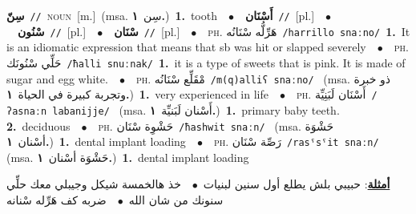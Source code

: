\documentclass[10pt,a4paper,twoside]{article} %
\begin{document}
\begin{multicols}{2}
{\setlength\topsep{0pt}\textbf{\foreignlanguage{arabic}{سِنّ}}\ {\color{gray}\texttt{//}\color{black}}\ \textsc{noun}\ [m.]\ \color{gray}(msa. \foreignlanguage{arabic}{سِن}~\foreignlanguage{arabic}{\textbf{١.}})\color{black}\ \textbf{1.}~tooth\ \ $\bullet$\ \ \setlength\topsep{0pt}\textbf{\foreignlanguage{arabic}{أَسْنَان}}\ {\color{gray}\texttt{//}\color{black}}\ [pl.]\ \ $\bullet$\ \ \setlength\topsep{0pt}\textbf{\foreignlanguage{arabic}{سْنُون}}\ {\color{gray}\texttt{//}\color{black}}\ [pl.]\ \ $\bullet$\ \ \setlength\topsep{0pt}\textbf{\foreignlanguage{arabic}{سْنَان}}\ {\color{gray}\texttt{//}\color{black}}\ [pl.]\ \ $\bullet$\ \ \textsc{ph.} \color{gray} \foreignlanguage{arabic}{هَرِّلُّه سْنَانُه}\color{black}\ {\color{gray}\texttt{/{\sffamily harrillo snaːno}/}\color{black}}\ \textbf{1.}~It is an idiomatic expression that means that sb was hit or slapped severely\ \ $\bullet$\ \ \textsc{ph.} \color{gray} \foreignlanguage{arabic}{حَلِّي سْنُونَك}\color{black}\ {\color{gray}\texttt{/{\sffamily ħalli snuːnak}/}\color{black}}\ \textbf{1.}~it is a type of sweets that is pink. It is made of sugar and egg white.\ \ $\bullet$\ \ \textsc{ph.} \color{gray} \foreignlanguage{arabic}{مْقَلِّع سْنَانُه}\color{black}\ {\color{gray}\texttt{/{\sffamily m(q)alliʕ snaːno}/}\color{black}}\ \color{gray} (msa. \foreignlanguage{arabic}{ذو خبرة وتجربة كبيرة في الحياة}~\foreignlanguage{arabic}{\textbf{١.}})\color{black}\ \textbf{1.}~very experienced in life\ \ $\bullet$\ \ \textsc{ph.} \color{gray} \foreignlanguage{arabic}{أَسْنَان لَبَنِيِّة}\color{black}\ {\color{gray}\texttt{/{\sffamily ʔasnaːn labanijje}/}\color{black}}\ \color{gray} (msa. \foreignlanguage{arabic}{أَسْنان لَبَنيِّة}~\foreignlanguage{arabic}{\textbf{١.}})\color{black}\ \textbf{1.}~primary baby teeth.  \textbf{2.}~deciduous\ \ $\bullet$\ \ \textsc{ph.} \color{gray} \foreignlanguage{arabic}{حَشْوِة سْنَان}\color{black}\ {\color{gray}\texttt{/{\sffamily ħashwit snaːn}/}\color{black}}\ \color{gray} (msa. \foreignlanguage{arabic}{حَشْوَة أسْنان}~\foreignlanguage{arabic}{\textbf{١.}})\color{black}\ \textbf{1.}~dental implant loading\ \ $\bullet$\ \ \textsc{ph.} \color{gray} \foreignlanguage{arabic}{رَصِّة سْنَان}\color{black}\ {\color{gray}\texttt{/{\sffamily rasˤsˤit snaːn}/}\color{black}}\ \color{gray} (msa. \foreignlanguage{arabic}{حَشْوَة أسْنان}~\foreignlanguage{arabic}{\textbf{١.}})\color{black}\ \textbf{1.}~dental implant loading\  \begin{flushright}\color{gray}\foreignlanguage{arabic}{\textbf{\underline{\foreignlanguage{arabic}{أمثلة}}}: حبيبي بلش يطلع أول سنين لبنيات\ $\bullet$\ \  خذ هالخمسة شيكل وجيبلي معك حلِّي سنونك من شان الله\ $\bullet$\ \  ضربه كف هَرِّله سْنانه}\end{flushright}\color{black}} \vspace{2mm}


\end{multicols}
\end{document}
